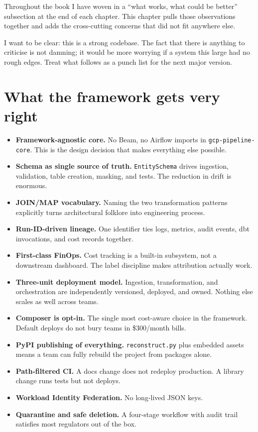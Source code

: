 \documentclass[
  11pt,
  british,
  oneside]{book}
\providecommand{\tightlist}{%
  \setlength{\itemsep}{0pt}\setlength{\parskip}{0pt}}
\begin{document}
Throughout the book I have woven in a ``what works, what could be
better'' subsection at the end of each chapter. This chapter pulls those
observations together and adds the cross-cutting concerns that did not
fit anywhere else.

I want to be clear: this is a strong codebase. The fact that there is
anything to criticise is not damning; it would be more worrying if a
system this large had no rough edges. Treat what follows as a punch list
for the next major version.

\hypertarget{what-the-framework-gets-very-right}{%
\section{What the framework gets very
right}\label{what-the-framework-gets-very-right}}

\begin{itemize}
\tightlist
\item
  \textbf{Framework-agnostic core.} No Beam, no Airflow imports in
  \texttt{gcp-pipeline-core}. This is the design decision that makes
  everything else possible.
\item
  \textbf{Schema as single source of truth.} \texttt{EntitySchema}
  drives ingestion, validation, table creation, masking, and tests. The
  reduction in drift is enormous.
\item
  \textbf{JOIN/MAP vocabulary.} Naming the two transformation patterns
  explicitly turns architectural folklore into engineering process.
\item
  \textbf{Run-ID-driven lineage.} One identifier ties logs, metrics,
  audit events, dbt invocations, and cost records together.
\item
  \textbf{First-class FinOps.} Cost tracking is a built-in subsystem,
  not a downstream dashboard. The label discipline makes attribution
  actually work.
\item
  \textbf{Three-unit deployment model.} Ingestion, transformation, and
  orchestration are independently versioned, deployed, and owned.
  Nothing else scales as well across teams.
\item
  \textbf{Composer is opt-in.} The single most cost-aware choice in the
  framework. Default deploys do not bury teams in \$300/month bills.
\item
  \textbf{PyPI publishing of everything.} \texttt{reconstruct.py} plus
  embedded assets means a team can fully rebuild the project from
  packages alone.
\item
  \textbf{Path-filtered CI.} A docs change does not redeploy production.
  A library change runs tests but not deploys.
\item
  \textbf{Workload Identity Federation.} No long-lived JSON keys.
\item
  \textbf{Quarantine and safe deletion.} A four-stage workflow with
  audit trail satisfies most regulators out of the box.
\end{itemize}
\end{document}

